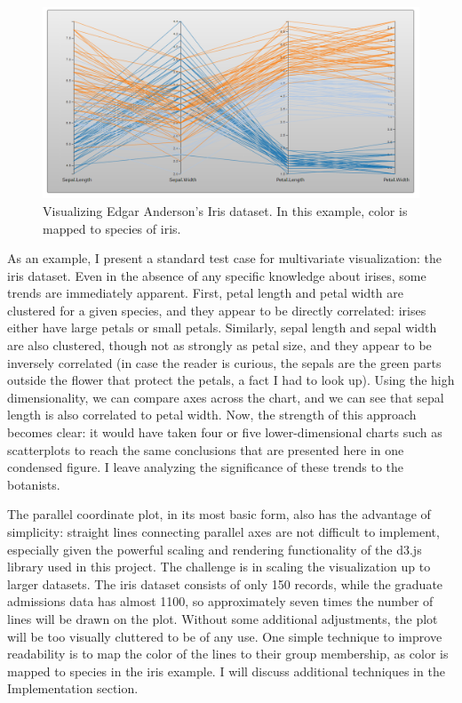 \documentclass[]{article}
\begin{document}
	\begin{figure}[h]
		\includegraphics[width=\linewidth]{iris.png}
		\caption{Visualizing Edgar Anderson's Iris dataset. In this example, color is mapped to species of iris.}
		\label{fig:Result}
	\end{figure}
	
	\par As an example, I present a standard test case for multivariate visualization: the iris dataset.\cite{datasets} Even in the absence of any specific knowledge about irises, some trends are immediately apparent. First, petal length and petal width are clustered for a given species, and they appear to be directly correlated: irises either have large petals or small petals. Similarly, sepal length and sepal width are also clustered, though not as strongly as petal size, and they appear to be inversely correlated (in case the reader is curious, the sepals are the green parts outside the flower that protect the petals, a fact I had to look up). Using the high dimensionality, we can compare axes across the chart, and we can see that sepal length is also correlated to petal width. Now, the strength of this approach becomes clear: it would have taken four or five lower-dimensional charts such as scatterplots to reach the same conclusions that are presented here in one condensed figure. I leave analyzing the significance of these trends to the botanists.
	
	\par The parallel coordinate plot, in its most basic form, also has the advantage of simplicity: straight lines connecting parallel axes are not difficult to implement, especially given the powerful scaling and rendering functionality of the d3.js library\cite{d3} used in this project. The challenge is in scaling the visualization up to larger datasets. The iris dataset consists of only 150 records, while the graduate admissions data has almost 1100, so approximately seven times the number of lines will be drawn on the plot. Without some additional adjustments, the plot will be too visually cluttered to be of any use. One simple technique to improve readability is to map the color of the lines to their group membership, as color is mapped to species in the iris example. I will discuss additional techniques in the Implementation section.
\end{document}
